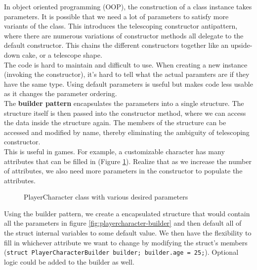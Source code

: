 \documentclass[10pt,letterpaper]{article}
\newcommand{\bs}{\bigskip}
\begin{document}
\begin{multicols}{2}
In object oriented programming (OOP), the construction of a class instance takes parameters. It is possible that we need a lot of parameters to satisfy more variants of the class. This introduces the telescoping constructor antipattern\cite{telescopingconstructor}, where there are numerous variations of constructor methods all delegate to the default constructor. This chains the different constructors together like an upside-down cake, or a telescope shape.\bs
\\
The code is hard to maintain and difficult to use. When creating a new instance (invoking the constructor), it's hard to tell what the actual paramters are if they have the same type. Using default parameters is useful but makes code less usable as it changes the parameter ordering.\bs
\\
The \textbf{builder pattern} encapsulates the parameters into a single structure. The structure itself is then passed into the constructor method, where we can access the data inside the structure again. The members of the structure can be accessed and modified by name, thereby eliminating the ambiguity of telescoping constructor.\bs
\\
This is useful in games. For example, a customizable character has many attributes that can be filled in (Figure \ref{fig:playercharacter-1}). Realize that as we increase the number of attributes, we also need more parameters in the constructor to populate the attributes.

\begin{figure}[H]
	\centering


	\caption{PlayerCharacter class with various desired parameters}
	\label{fig:playercharacter-1}
\end{figure}

Using the builder pattern, we create a encapsulated structure that would contain all the parameters in figure \ref{fig:playercharacter-builder} and then default all of the struct internal variables to some default value. We then have the flexibility to fill in whichever attribute we want to change by modifying the struct's members (\texttt{struct PlayerCharacterBuilder builder; builder.age = 25;}). Optional logic could be added to the builder as well.


\end{multicols}
\end{document}
